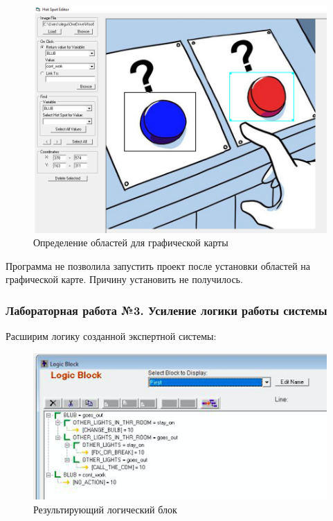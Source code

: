 \documentclass[14pt,a4paper,report]{report}
\begin{document}
\begin{figure}[h!]
	\centering
	\includegraphics[scale = 0.50]{images/2_2.png}
	\caption{Определение областей для графической карты}
\end{figure}

Программа не позволила запустить проект после установки областей на графической карте. Причину установить не получилось.

\subsubsection{Лабораторная работа №3. Усиление логики работы системы}

Расширим логику созданной экспертной системы:

\begin{figure}[h!]
	\centering
	\includegraphics[scale = 0.85]{images/3_1.png}
	\caption{Результирующий логический блок}
\end{figure}
\end{document}
